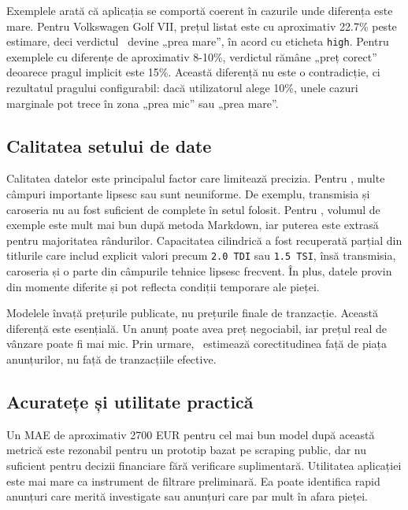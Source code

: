 Exemplele arată că aplicația se comportă coerent în cazurile unde diferența este mare. Pentru Volkswagen Golf VII, prețul listat este cu aproximativ 22.7\% peste estimare, deci verdictul \project\ devine „prea mare”, în acord cu eticheta \texttt{high}. Pentru exemplele cu diferențe de aproximativ 8-10\%, verdictul rămâne „preț corect” deoarece pragul implicit este 15\%. Această diferență nu este o contradicție, ci rezultatul pragului configurabil: dacă utilizatorul alege 10\%, unele cazuri marginale pot trece în zona „prea mic” sau „prea mare”.

\subsection{Calitatea setului de date}
\label{sec:evaluation-data-quality}

Calitatea datelor este principalul factor care limitează precizia. Pentru \autovit, multe câmpuri importante lipsesc sau sunt neuniforme. De exemplu, transmisia și caroseria nu au fost suficient de complete în setul folosit. Pentru \mobilede, volumul de exemple este mult mai bun după metoda Markdown, iar puterea este extrasă pentru majoritatea rândurilor. Capacitatea cilindrică a fost recuperată parțial din titlurile care includ explicit valori precum \texttt{2.0 TDI} sau \texttt{1.5 TSI}, însă transmisia, caroseria și o parte din câmpurile tehnice lipsesc frecvent. În plus, datele provin din momente diferite și pot reflecta condiții temporare ale pieței.

Modelele învață prețurile publicate, nu prețurile finale de tranzacție. Această diferență este esențială. Un anunț poate avea preț negociabil, iar prețul real de vânzare poate fi mai mic. Prin urmare, \project\ estimează corectitudinea față de piața anunțurilor, nu față de tranzacțiile efective.

\subsection{Acuratețe și utilitate practică}
\label{sec:evaluation-usefulness}

Un MAE de aproximativ 2700 EUR pentru cel mai bun model după această metrică este rezonabil pentru un prototip bazat pe scraping public, dar nu suficient pentru decizii financiare fără verificare suplimentară. Utilitatea aplicației este mai mare ca instrument de filtrare preliminară. Ea poate identifica rapid anunțuri care merită investigate sau anunțuri care par mult în afara pieței.

